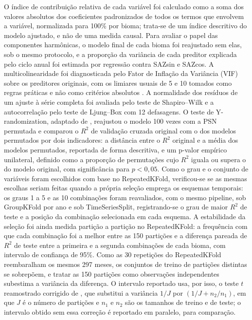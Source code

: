 \documentclass[a4paper,fleqn]{cas-sc}
\begin{document}
O índice de contribuição relativa de cada variável foi calculado como a soma dos valores absolutos dos coeficientes padronizados de todos os termos que envolvem a variável, normalizada para 100\% por bioma; trata-se de um índice descritivo do modelo ajustado, e não de uma medida causal. Para avaliar o papel das componentes harmônicas, o modelo final de cada bioma foi reajustado sem elas, sob o mesmo protocolo, e a proporção da variância de cada preditor explicada pelo ciclo anual foi estimada por regressão contra SAZsin e SAZcos. A multicolinearidade foi diagnosticada pelo Fator de Inflação da Variância (VIF) sobre os preditores originais, com os limiares usuais de 5 e 10 tomados como regras práticas e não como critérios absolutos \citep{obrien2007}. A normalidade dos resíduos de um ajuste à série completa foi avaliada pelo teste de Shapiro--Wilk e a autocorrelação pelo teste de Ljung--Box com 12 defasagens. O teste de Y-randomization, adaptado de \citet{guimaraes2024}, reajustou o modelo 100 vezes com a PSN permutada e comparou o $R^2$ de validação cruzada original com o dos modelos permutados por dois indicadores: a distância entre o $R^2$ original e a média dos modelos permutados, reportada de forma descritiva, e um p-valor empírico unilateral, definido como a proporção de permutações cujo $R^2$ iguala ou supera o do modelo original, com significância para $p < 0,05$. Como o grau e o conjunto de variáveis foram escolhidos com base no RepeatedKFold, verificou-se se as mesmas escolhas seriam feitas quando a própria seleção emprega os esquemas temporais: os graus 1 a 5 e as 10 combinações foram reavaliados, com o mesmo pipeline, sob GroupKFold por ano e sob TimeSeriesSplit, registrando-se o grau de maior $R^2$ de teste e a posição da combinação selecionada em cada esquema. A estabilidade da seleção foi ainda medida partição a partição no RepeatedKFold: a frequência com que cada combinação foi a melhor entre as 150 partições e a diferença pareada de $R^2$ de teste entre a primeira e a segunda combinações de cada bioma, com intervalo de confiança de 95\%. Como as 30 repetições do RepeatedKFold reembaralham os mesmos 297 meses, os conjuntos de treino de partições distintas se sobrepõem, e tratar as 150 partições como observações independentes subestima a variância da diferença. O intervalo reportado usa, por isso, o teste $t$ reamostrado corrigido de \citet{nadeau2003}, que substitui a variância $1/J$ por $(1/J + n_2/n_1)$, em que $J$ é o número de partições e $n_1$ e $n_2$ são os tamanhos de treino e de teste; o intervalo obtido sem essa correção é reportado em paralelo, para comparação.
\end{document}
